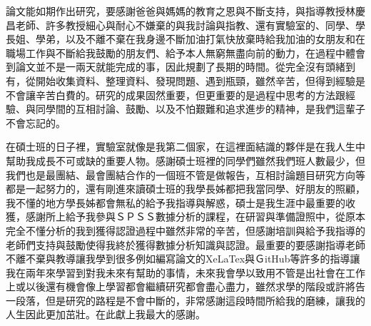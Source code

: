  論文能如期作出研究，要感謝爸爸與媽媽的教育之恩與不斷支持，與指導教授林慶昌老師、許多教授細心與耐心不嫌棄的與我討論與指教、還有實驗室的、同學、學長姐、學弟，以及不離不棄在我身邊不斷加油打氣快放棄時給我加油的女朋友和在職場工作與不斷給我鼓勵的朋友們、給予本人無窮無盡向前的動力，在過程中體會到論文並不是一兩天就能完成的事，因此規劃了長期的時間。從完全沒有頭緒到有，從開始收集資料、整理資料、發現問題、遇到瓶頸，雖然辛苦，但得到經驗是不會讓辛苦白費的。研究的成果固然重要，但更重要的是過程中思考的方法跟經驗、與同學間的互相討論、鼓勵、以及不怕艱難和追求進步的精神，是我們這輩子不會忘記的。

在碩士班的日子裡，實驗室就像是我第二個家，在這裡面結識的夥伴是在我人生中幫助我成長不可或缺的重要人物。感謝碩士班裡的同學們雖然我們班人數最少，但我們也是最團結、最會團結合作的一個班不管是做報告，互相討論題目研究方向等都是一起努力的，還有剛進來讀碩士班的我學長姊都把我當同學、好朋友的照顧，我不懂的地方學長姊都會無私的給予我指導與解惑，碩士是我生涯中最重要的收獲，感謝所上給予我參與ＳＰＳＳ數據分析的課程，在研習與準備證照中，從原本完全不懂分析的我到獲得認證過程中雖然非常的辛苦，但感謝培訓與給予我指導的老師們支持與鼓勵使得我終於獲得數據分析知識與認證。最重要的要感謝指導老師不離不棄與教導讓我學到很多例如編寫論文的XeLaTex與ＧitHub等許多的指導讓我在兩年來學習到對我未來有幫助的事情，未來我會學以致用不管是出社會在工作上或以後還有機會像上學習都會繼續研究都會盡心盡力，雖然求學的階段或許將告一段落，但是研究的路程是不會中斷的，非常感謝這段時間所給我的磨練，讓我的人生因此更加茁壯。在此獻上我最大的感謝。



